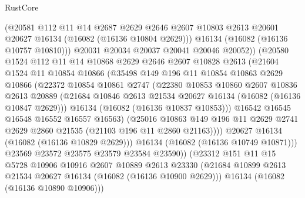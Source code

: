 \begin{lexlean}{RustCore}
\begin{coremodule}
                  (@20581
                    @112
                    @11
                    @14
                    @2687
                    @2629
                    @2646
                    @2607
                    @10803
                    @2613
                    @20601
                    @20627
                    @16134
                    (@16082 (@16136 @10804 @2629)))
                  @16134
                  (@16082 (@16136 @10757 @10810)))
                @20031
                @20034
                @20037
                @20041
                @20046
                @20052))
            (@20580
              @1524
              @112
              @11
              @14
              @10868
              @2629
              @2646
              @2607
              @10828
              @2613
              (@21604
                @1524
                @11
                @10854
                @10866
                (@35498
                  @149
                  @196
                  @11
                  @10854
                  @10863
                  @2629
                  @10866
                  (@22372
                    @10854
                    @10861
                    @2747
                    (@22380
                      @10853
                      @10860
                      @2607
                      @10836
                      @2613
                      @20889
                      (@21684 @10846 @2613 @21534 @20627 @16134 (@16082 (@16136 @10847 @2629)))
                      @16134
                      (@16082 (@16136 @10837 @10853)))
                    @16542
                    @16545
                    @16548
                    @16552
                    @16557
                    @16563)
                  (@25016
                    @10863
                    @149
                    @196
                    @11
                    @2629
                    @2741
                    @2629
                    @2860
                    @21535
                    (@21103 @196 @11 @2860 @21163))))
              @20627
              @16134
              (@16082 (@16136 @10829 @2629)))
            @16134
            (@16082 (@16136 @10749 @10871)))
          @23569
          @23572
          @23575
          @23579
          @23584
          @23590))
      (@23312
        @151
        @11
        @15
        @5728
        @10906
        @10916
        @2607
        @10889
        @2613
        @23330
        (@21684 @10899 @2613 @21534 @20627 @16134 (@16082 (@16136 @10900 @2629)))
        @16134
        (@16082 (@16136 @10890 @10906)))

\end{coremodule}
\end{lexlean}
